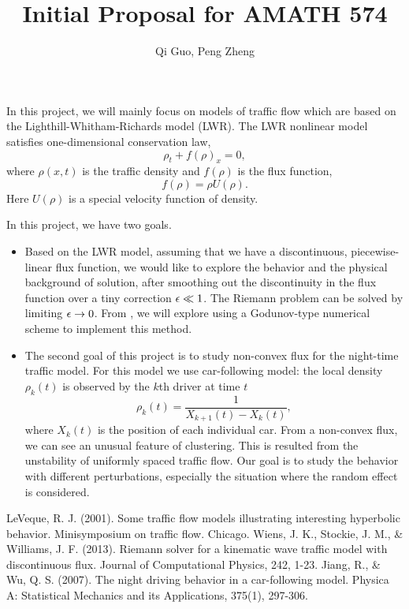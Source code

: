 \documentclass[11pt]{article}
\begin{document}
\title{\bf Initial Proposal for AMATH 574}
\author{Qi Guo, Peng Zheng}
\date{}
\maketitle

In this project, we will mainly focus on models of traffic flow which are based on the Lighthill-Whitham-Richards model (LWR). The LWR nonlinear model satisfies one-dimensional conservation law,
\[\rho_t+f(\rho)_x=0,\]
where $\rho(x,t)$ is the traffic density and $f(\rho)$ is the flux function,
\[f(\rho)=\rho U(\rho).\]
Here $U(\rho)$ is a special velocity function of density.

\vskip 8pt
In this project, we have two goals.
\begin{itemize}
\item Based on the LWR model, assuming that we have a discontinuous, piecewise-linear flux function, we would like to explore the behavior and the physical background of solution, after smoothing out the discontinuity in the flux function over a tiny correction $\epsilon\ll1$. The Riemann problem can be solved by limiting $\epsilon\rightarrow0$.
\vskip 8pt
From \cite{WS}, we will explore using a  Godunov-type numerical scheme to implement this method.
\item The second goal of this project is to study non-convex flux for the night-time traffic model. For this model we use car-following model: the local density $\rho_k(t)$ is observed by the $k$th driver at time $t$
\[\rho_k(t)=\frac{1}{X_{k+1}(t)-X_k(t)},\]
where $X_k(t)$ is the position of each individual car.
\vskip 8pt
From a non-convex flux, we can see an unusual feature of clustering. This is resulted from the unstability of uniformly spaced traffic flow. Our goal is to study the behavior with different perturbations, especially the situation where the random effect is considered.

\end{itemize}
{\footnotesize
\begin{thebibliography}{100}
 LeVeque, R. J. (2001). Some traffic flow models illustrating interesting hyperbolic behavior. Minisymposium on traffic flow.
Chicago.
 Wiens, J. K., Stockie, J. M., \& Williams, J. F. (2013). Riemann solver for a kinematic wave traffic model with discontinuous flux. Journal of Computational Physics, 242, 1-23.
 Jiang, R., \& Wu, Q. S. (2007). The night driving behavior in a car-following model. Physica A: Statistical Mechanics and its Applications, 375(1), 297-306.
\end{thebibliography}
}
\end{document}
